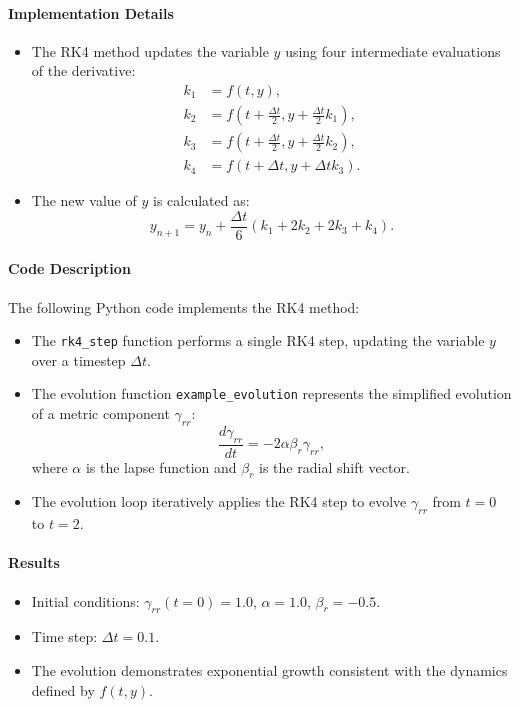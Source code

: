 \documentclass[12pt]{article}
\begin{document}
\paragraph{Implementation Details}
\begin{itemize}
    \item The RK4 method updates the variable $y$ using four intermediate evaluations of the derivative:
    \begin{align*}
        k_1 &= f(t, y), \\
        k_2 &= f\left(t + \frac{\Delta t}{2}, y + \frac{\Delta t}{2} k_1\right), \\
        k_3 &= f\left(t + \frac{\Delta t}{2}, y + \frac{\Delta t}{2} k_2\right), \\
        k_4 &= f(t + \Delta t, y + \Delta t k_3).
    \end{align*}
    \item The new value of $y$ is calculated as:
    \[
    y_{n+1} = y_n + \frac{\Delta t}{6}(k_1 + 2k_2 + 2k_3 + k_4).
    \]
\end{itemize}

\paragraph{Code Description}
The following Python code implements the RK4 method:
\begin{itemize}
    \item The \texttt{rk4\_step} function performs a single RK4 step, updating the variable $y$ over a timestep $\Delta t$.
    \item The evolution function \texttt{example\_evolution} represents the simplified evolution of a metric component $\gamma_{rr}$:
    \[
    \frac{d\gamma_{rr}}{dt} = -2 \alpha \beta_r \gamma_{rr},
    \]
    where $\alpha$ is the lapse function and $\beta_r$ is the radial shift vector.
    \item The evolution loop iteratively applies the RK4 step to evolve $\gamma_{rr}$ from $t=0$ to $t=2$.
\end{itemize}

\paragraph{Results}
\begin{itemize}
    \item Initial conditions: $\gamma_{rr}(t=0) = 1.0$, $\alpha = 1.0$, $\beta_r = -0.5$.
    \item Time step: $\Delta t = 0.1$.
    \item The evolution demonstrates exponential growth consistent with the dynamics defined by $f(t, y)$.
\end{itemize}
\end{document}

